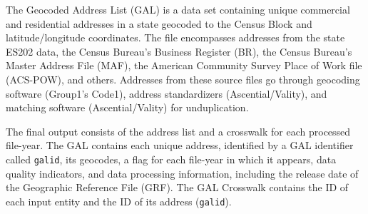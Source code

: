 %

The Geocoded Address List (GAL) is a data set containing unique commercial and residential addresses
in a state geocoded to the Census Block and latitude/longitude coordinates. The file encompasses
addresses from the state ES202 data, the Census Bureau's Business Register (BR), the Census Bureau's Master
Address File (MAF), the American Community Survey Place of Work file (ACS-POW), and others.
Addresses from these source files go through geocoding software (Group1's
Code1), address standardizers (Ascential/Vality), and matching software
(Ascential/Vality) for
unduplication. 

% 
% 
% 

The final output consists of the address list and a crosswalk for each
processed file-year. The GAL contains each unique address, identified by a
GAL identifier called {\tt galid}, its geocodes, a flag for each file-year
in which it appears, data quality indicators, and data processing
information, including the release date of the Geographic Reference File (GRF).
%
 The GAL Crosswalk contains the ID of each input entity and the
ID of its address ({\tt galid}).

